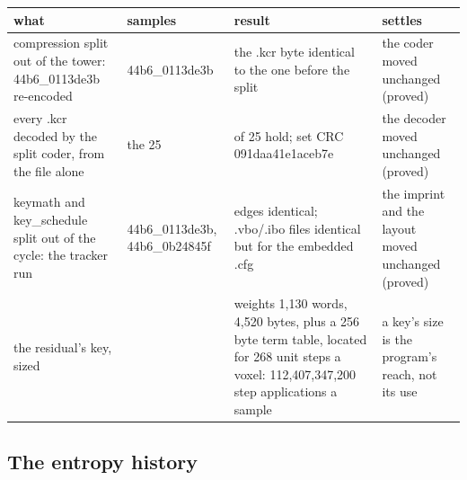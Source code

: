 {\footnotesize
\setlength{\tabcolsep}{6pt}
\begin{longtable}{>{\RaggedRight\arraybackslash}p{}>{\RaggedRight\arraybackslash}p{}>{\RaggedRight\arraybackslash}p{}>{\RaggedRight\arraybackslash}p{}}
\toprule
what & samples & result & settles \\
\midrule
\endhead
compression split out of the tower: 44b6\_\allowbreak{}0113de3b re-encoded & 44b6\_\allowbreak{}0113de3b & the .kcr byte identical to the one before the split & the coder moved unchanged (proved) \\
every .kcr decoded by the split coder, from the file alone & the 25 & 25 of 25 hold; set CRC 091daa41e1aceb7e & the decoder moved unchanged (proved) \\
keymath and key\_\allowbreak{}schedule split out of the cycle: the tracker run & 44b6\_\allowbreak{}0113de3b, 44b6\_\allowbreak{}0b24845f & edges identical; .vbo/.ibo files identical but for the embedded .cfg & the imprint and the layout moved unchanged (proved) \\
the residual's key, sized &  & weights 1,130 words, 4,520 bytes, plus a 256 byte term table, located for 268 unit steps a voxel: 112,407,347,200 step applications a sample & a key's size is the program's reach, not its use \\
\bottomrule
\end{longtable}
}

\subsection{\texorpdfstring{The entropy history}{The entropy history}}

